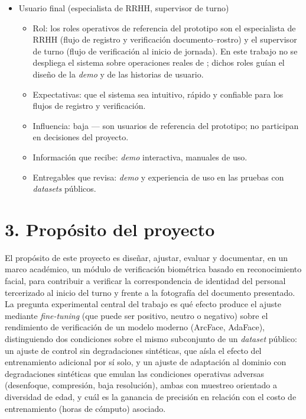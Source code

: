 \documentclass[
  11pt, %
]{charter}
\begin{document}
\begin{itemize}
\begin{itemize}
      \item Expectativas: completar el trabajo final con calidad, dentro del plazo y las horas estimadas.
      \item Influencia: media --- ejecuta y documenta, pero depende de las decisiones del cliente y la orientadora.
      \item Información que recibe: reuniones con cliente y orientadora, retroalimentación sobre entregables.
      \item Entregables que revisa: todo el código, la documentación técnica y la memoria del trabajo final.
    \end{itemize}
  \item Usuario final (especialista de RRHH, supervisor de turno)
    \begin{itemize}
      \item Rol: los roles operativos de referencia del prototipo son el especialista de RRHH (flujo de registro y verificación documento--rostro) y el supervisor de turno (flujo de verificación al inicio de jornada). En este trabajo no se despliega el sistema sobre operaciones reales de \empclientename; dichos roles guían el diseño de la \textit{demo} y de las historias de usuario.
      \item Expectativas: que el sistema sea intuitivo, rápido y confiable para los flujos de registro y verificación.
      \item Influencia: baja --- son usuarios de referencia del prototipo; no participan en decisiones del proyecto.
      \item Información que recibe: \textit{demo} interactiva, manuales de uso.
      \item Entregables que revisa: \textit{demo} y experiencia de uso en las pruebas con \textit{datasets} públicos.
    \end{itemize}
\end{itemize}

\section{3. Propósito del proyecto}
\label{sec:proposito}

El propósito de este proyecto es diseñar, ajustar, evaluar y documentar, en un marco académico, un módulo de verificación biométrica basado en reconocimiento facial, para contribuir a verificar la correspondencia de identidad del personal tercerizado al inicio del turno y frente a la fotografía del documento presentado. La pregunta experimental central del trabajo es qué efecto produce el ajuste mediante \textit{fine-tuning} (que puede ser positivo, neutro o negativo) sobre el rendimiento de verificación de un modelo moderno (ArcFace, AdaFace), distinguiendo dos condiciones sobre el mismo subconjunto de un \textit{dataset} público: un ajuste de control sin degradaciones sintéticas, que aísla el efecto del entrenamiento adicional por sí solo, y un ajuste de adaptación al dominio con degradaciones sintéticas que emulan las condiciones operativas adversas (desenfoque, compresión, baja resolución), ambas con muestreo orientado a diversidad de edad, y cuál es la ganancia de precisión en relación con el costo de entrenamiento (horas de cómputo) asociado.
\end{document}
